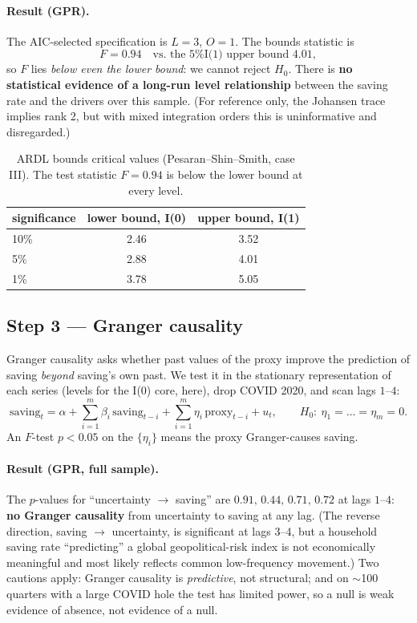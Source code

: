 \documentclass[11pt,a4paper]{article}
\begin{document}
\paragraph{Result (GPR).} The AIC-selected specification is $L=3$, $O=1$. The
bounds statistic is
\[
  F = 0.94 \quad\text{vs.\ the 5\% I(1) upper bound } 4.01,
\]
so $F$ lies \emph{below even the lower bound}: we cannot reject $H_0$. There is
\textbf{no statistical evidence of a long-run level relationship} between the
saving rate and the drivers over this sample. (For reference only, the Johansen
trace implies rank 2, but with mixed integration orders this is uninformative and
disregarded.)

\begin{table}[htbp]\centering
\caption{ARDL bounds critical values (Pesaran--Shin--Smith, case III). The
test statistic $F=0.94$ is below the lower bound at every level.}
\renewcommand{\arraystretch}{1.15}
\begin{tabular}{@{}lcc@{}}
\toprule
significance & lower bound, I(0) & upper bound, I(1) \\
\midrule
10\% & 2.46 & 3.52 \\
 5\% & 2.88 & 4.01 \\
 1\% & 3.78 & 5.05 \\
\bottomrule
\end{tabular}
\end{table}

\subsection{Step 3 --- Granger causality}
Granger causality asks whether past values of the proxy improve the prediction of
saving \emph{beyond} saving's own past. We test it in the stationary
representation of each series (levels for the I(0) core, here), drop COVID 2020,
and scan lags $1$--$4$:
\begin{equation}
  \text{saving}_t = \alpha + \sum_{i=1}^{m}\beta_i\,\text{saving}_{t-i}
    + \sum_{i=1}^{m}\eta_i\,\text{proxy}_{t-i} + u_t,
  \qquad H_0:\ \eta_1=\dots=\eta_m=0 .
\end{equation}
An $F$-test $p<0.05$ on the $\{\eta_i\}$ means the proxy Granger-causes saving.

\paragraph{Result (GPR, full sample).} The $p$-values for ``uncertainty $\to$
saving'' are $0.91,\,0.44,\,0.71,\,0.72$ at lags $1$--$4$: \textbf{no Granger
causality} from uncertainty to saving at any lag. (The reverse direction,
saving $\to$ uncertainty, is significant at lags 3--4, but a household saving
rate ``predicting'' a global geopolitical-risk index is not economically
meaningful and most likely reflects common low-frequency movement.) Two cautions
apply: Granger causality is \emph{predictive}, not structural; and on $\sim$100
quarters with a large COVID hole the test has limited power, so a null is weak
evidence of absence, not evidence of a null.
\end{document}
